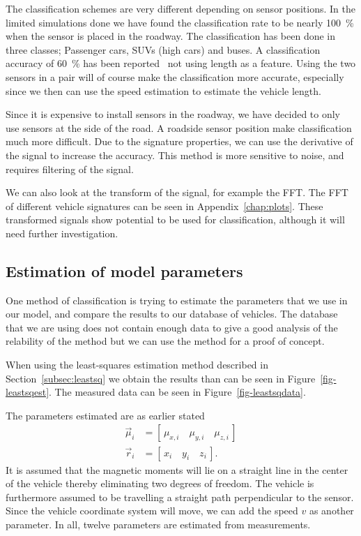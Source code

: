 The classification schemes are very different depending on sensor positions. In the limited simulations done we have found the classification rate to be nearly 100~\% when the sensor is placed in the roadway. The classification has been done in three classes; Passenger cars, SUVs (high cars) and buses. A classification accuracy of 60~\% has been reported~\cite{cheung2005-2} not using length as a feature. Using the two sensors in a pair will of course make the classification more accurate, especially since we then can use the speed estimation to estimate the vehicle length.

Since it is expensive to install sensors in the roadway, we have decided to only use sensors at the side of the road. A roadside sensor position make classification much more difficult. Due to the signature properties, we can use the derivative of the signal to increase the accuracy. This method is more sensitive to noise, and requires filtering of the signal.

We can also look at the transform of the signal, for example the FFT. The FFT of different vehicle signatures can be seen in Appendix~\ref{chap:plots}. These transformed signals show potential to be used for classification, although it will need further investigation.

\subsection{Estimation of model parameters}\label{sec:leastsq_per}

One method of classification is trying to estimate the parameters that we use in our model, and compare the results to our database of vehicles. The database that we are using does not contain enough data to give a good analysis of the relability of the method but we can use the method for a proof of concept.

When using the least-squares estimation method described in Section~\ref{subsec:leastsq} we obtain the results than can be seen in Figure~\ref{fig-leastsqest}. The measured data can be seen in Figure~\ref{fig-leastsqdata}.

The parameters estimated are as earlier stated
\begin{align}
	\vec{\mu}_i &= \left[\,\mu_{x,i}\quad{}\mu_{y,i}\quad{}\mu_{z,i}\,\right]\\
	\vec{r}_i &= \left[\,x_i\quad{}y_i\quad{}z_i\,\right].
\end{align}
It is assumed that the magnetic moments will lie on a straight line in the center of the vehicle thereby eliminating two degrees of freedom. The vehicle is furthermore assumed to be travelling a straight path perpendicular to the sensor. Since the vehicle coordinate system will move, we can add the speed $v$ as another parameter. In all, twelve parameters are estimated from measurements.

